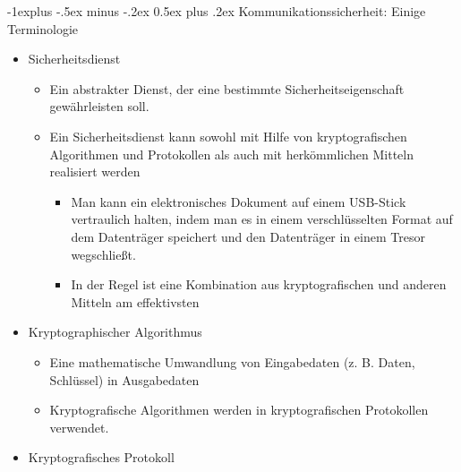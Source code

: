 \documentclass[a4paper]{article}
\makeatletter
\renewcommand{\subsection}{\@startsection{subsection}{2}{0mm}%
 {-1explus -.5ex minus -.2ex}%
 {0.5ex plus .2ex}%
 {\normalfont\normalsize\bfseries}}
\makeatother
\begin{document}
\begin{multicols}{3}
    \subsection{Kommunikationssicherheit: Einige
        Terminologie}

    \begin{itemize}
        \item
              Sicherheitsdienst

              \begin{itemize}
                  \item
                        Ein abstrakter Dienst, der eine bestimmte Sicherheitseigenschaft
                        gewährleisten soll.
                  \item
                        Ein Sicherheitsdienst kann sowohl mit Hilfe von kryptografischen
                        Algorithmen und Protokollen als auch mit herkömmlichen Mitteln
                        realisiert werden

                        \begin{itemize}
                            \item
                                  Man kann ein elektronisches Dokument auf einem USB-Stick
                                  vertraulich halten, indem man es in einem verschlüsselten Format
                                  auf dem Datenträger speichert und den Datenträger in einem Tresor
                                  wegschließt.
                            \item
                                  In der Regel ist eine Kombination aus kryptografischen und anderen
                                  Mitteln am effektivsten
                        \end{itemize}
              \end{itemize}
        \item
              Kryptographischer Algorithmus

              \begin{itemize}
                  \item
                        Eine mathematische Umwandlung von Eingabedaten (z. B. Daten,
                        Schlüssel) in Ausgabedaten
                  \item
                        Kryptografische Algorithmen werden in kryptografischen Protokollen
                        verwendet.
              \end{itemize}
        \item
              Kryptografisches Protokoll


\end{itemize}
\end{multicols}
\end{document}
